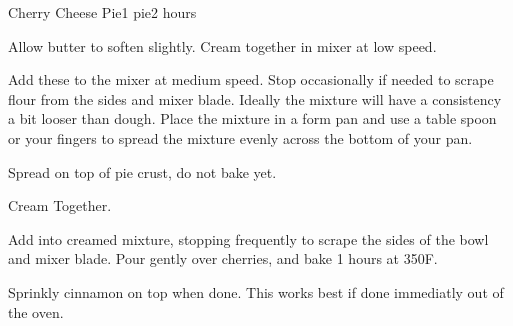 \begin{recipe}{Cherry Cheese Pie}{1 pie}{2 hours}



  Allow butter to soften slightly.  Cream together in mixer at low speed.

  


  Add these to the mixer at medium speed.  Stop occasionally if needed
  to scrape flour from the sides and mixer blade.  Ideally the mixture
  will have a consistency a bit looser than dough.  Place the mixture in 
  a form pan and use a table spoon or your fingers to spread the mixture
  evenly across the bottom of your pan.


  Spread on top of pie crust, do not bake yet.



  Cream Together.






  Add into creamed mixture, stopping frequently to scrape the sides
  of the bowl and mixer blade.  Pour gently over cherries, and bake 1 hours at 350\0F.


  Sprinkly cinnamon on top when done.  This works best if done immediatly
  out of the oven.
\end{recipe}